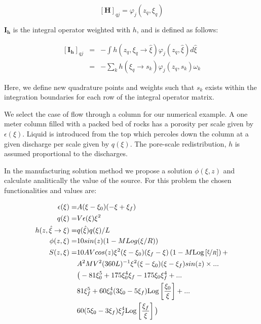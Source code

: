 \documentclass{CFD2011}
\newcommand{\Fede}[1]{\textcolor{green}{Fede: #1} \\}
\newcommand{\Pablo}[1]{#1}
\begin{document}
\begin{equation}
\left[\mathbf{H}\right]_{qj}=\varphi_j(z_q,\xi_q)
\end{equation}

$\mathbf{I_h}$ is the integral operator weighted with $h$, and is defined as follows:

\begin{eqnarray}
\left[\mathbf{I_h}\right]_{qj}&=& \Pablo{-} \int h(z_q,\xi_q\rightarrow\hat{\xi})\varphi_j(z_q,\hat{\xi}) d\hat{\xi}\nonumber \\
&=& \Pablo{-} \sum_k h(\xi_q\rightarrow s_k )\varphi_j(z_q,s_k) \omega_k
\end{eqnarray}

Here, we define new quadrature points and weights such that $s_k$ exists within the integration boundaries for each row of the integral operator matrix. 



We select the case of flow through a column for our numerical example. A one meter column filled with a packed bed of rocks has a porosity per scale given by $\epsilon({\xi})$. Liquid is introduced from the top which percoles down the column at a given discharge per scale given by $q({\xi})$. The pore-scale redistribution, $h$  is assumed proportional to the discharges.

In the manufacturing solution method we propose a solution $\phi(\xi, z)$ and calculate analitically the value of the source. For this problem the chosen functionalities and values are:

\begin{align}
\epsilon(\xi)=&A (\xi-\xi_0) (-\xi+\xi_f) \\
q({\xi}) =&V \epsilon(\xi) \xi^2\\
h(z, \hat \xi \rightarrow \xi) =& q(\hat \xi) q(\xi)/L\\
\phi(z, \xi) =& 10 sin(z) (1-M Log({\xi}/R))\\
\nonumber S(z, \xi)=& 10 A V cos(z) {\xi}^2 ({\xi}-\xi_0) (\xi_f-{\xi}) \left(1-M \text{Log}\left[\nicefrac{{\xi}}{R}\right]\right) +\\
\nonumber  &A^2 M V^2  (360 L)^{-1} {\xi}^2 ({\xi}-\xi_0) ({\xi}-\xi_f) sin(z) \times ... \\
\nonumber  &\big(-81 \xi_0^5+175 \xi_0^4 \xi_f-175 \xi_0 \xi_f^4+  ...\\
\nonumber &81 \xi_f^5+60 \xi_0^4 (3 \xi_0-5 \xi_f) \text{Log}\left[\frac{\xi_0}{{\xi}}\right]+ ...\\
& 60 (5 \xi_0-3 \xi_f) \xi_f^4 \text{Log}\left[\frac{\xi_f}{{\xi}}\right]\big)
\end{align}
\end{document}

